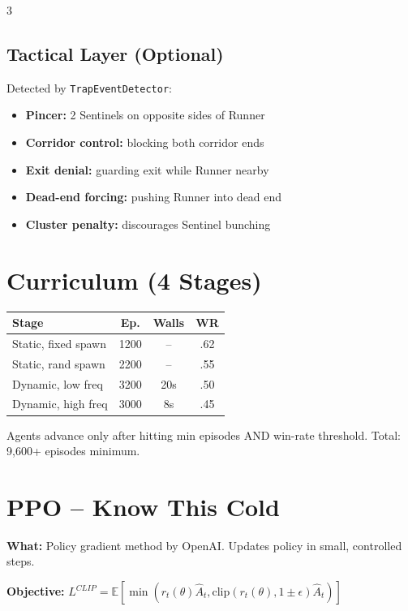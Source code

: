 \documentclass[10pt,landscape,a4paper]{article}
\begin{document}
\begin{multicols}{3}
\subsection{Tactical Layer (Optional)}
Detected by \texttt{TrapEventDetector}:
\begin{itemize}
\item \textbf{Pincer:} 2 Sentinels on opposite sides of Runner
\item \textbf{Corridor control:} blocking both corridor ends
\item \textbf{Exit denial:} guarding exit while Runner nearby
\item \textbf{Dead-end forcing:} pushing Runner into dead end
\item \textbf{Cluster penalty:} discourages Sentinel bunching
\end{itemize}

\section{Curriculum (4 Stages)}

\begin{tabular}{@{}lccc@{}}
\toprule
Stage & Ep. & Walls & WR \\
\midrule
Static, fixed spawn & 1200 & -- & .62 \\
Static, rand spawn & 2200 & -- & .55 \\
Dynamic, low freq & 3200 & 20s & .50 \\
Dynamic, high freq & 3000 & 8s & .45 \\
\bottomrule
\end{tabular}

Agents advance only after hitting min episodes AND win-rate threshold. Total: 9,600+ episodes minimum.

\section{PPO -- Know This Cold}

\textbf{What:} Policy gradient method by OpenAI. Updates policy in small, controlled steps.

\textbf{Objective:}
$L^{CLIP} = \mathbb{E}[\min(r_t(\theta)\hat{A}_t, \text{clip}(r_t(\theta), 1{\pm}\epsilon)\hat{A}_t)]$


\end{multicols}
\end{document}
